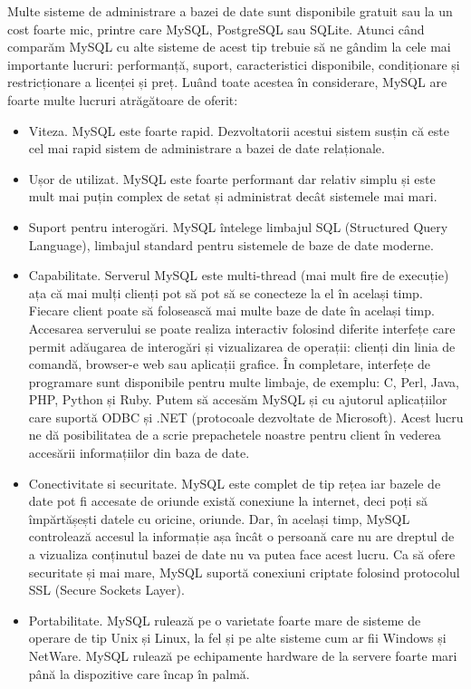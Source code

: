 \documentclass[12pt]{book}
\begin{document}
Multe sisteme de administrare a bazei de date sunt disponibile gratuit sau la un cost foarte mic, printre care MySQL, PostgreSQL sau SQLite. Atunci când comparăm MySQL cu alte sisteme de acest tip trebuie să ne gândim la cele mai importante lucruri: performanță, suport, caracteristici disponibile, condiționare și restricționare a licenței și preț. Luând toate acestea în considerare, MySQL are foarte multe lucruri atrăgătoare de oferit:
\begin{addmargin}[4em]{1em}
\begin{itemize}
	\item Viteza. MySQL este foarte rapid. Dezvoltatorii acestui sistem susțin că este cel mai rapid sistem de administrare a bazei de date relaționale. 
	\item Ușor de utilizat. MySQL este foarte performant dar relativ simplu și este mult mai puțin complex de setat și administrat decât sistemele mai mari.
	\item Suport pentru interogări. MySQL întelege limbajul SQL (Structured Query Language), limbajul standard pentru sistemele de baze de date moderne.
	\item Capabilitate. Serverul MySQL este multi-thread (mai mult fire de execuție) ața că mai mulți clienți pot să pot să se conecteze la el în același timp. Fiecare client poate să folosească mai multe baze de date în același timp. Accesarea serverului se poate realiza interactiv folosind diferite interfețe care permit adăugarea de interogări și vizualizarea de operații: clienți din linia de comandă, browser-e web sau aplicații grafice. În completare, interfețe de programare sunt disponibile pentru multe limbaje, de exemplu: C, Perl, Java, PHP, Python și Ruby. Putem să accesăm MySQL și cu ajutorul aplicațiilor care suportă ODBC și .NET (protocoale dezvoltate de Microsoft). Acest lucru ne dă posibilitatea de a scrie prepachetele noastre pentru client în vederea accesării informațiilor din baza de date.
	\item Conectivitate si securitate. MySQL este complet de tip rețea iar bazele de date pot fi accesate de oriunde există conexiune la internet, deci poți să împărtășești datele cu oricine, oriunde. Dar, în același timp, MySQL controlează accesul la informație așa încât o persoană care nu are dreptul de a vizualiza conținutul bazei de date nu va putea face acest lucru. Ca să ofere securitate și mai mare, MySQL suportă conexiuni criptate folosind protocolul SSL (Secure Sockets Layer).
	\item Portabilitate. MySQL rulează pe o varietate foarte mare de sisteme de operare de tip Unix și Linux, la fel și pe alte sisteme cum ar fii Windows și NetWare. MySQL rulează pe echipamente hardware de la servere foarte mari până la dispozitive care încap în palmă. 

\end{itemize}
\end{addmargin}
\end{document}
